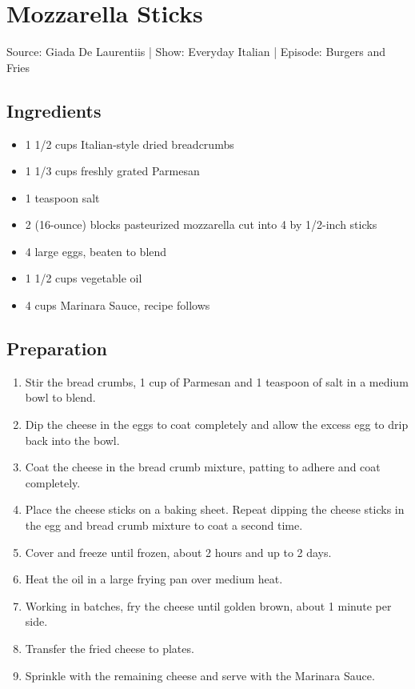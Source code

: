 \section{Mozzarella Sticks}

Source: Giada De Laurentiis |
Show: Everyday Italian |
Episode: Burgers and Fries

\subsection{Ingredients}
\begin{multicols}{2}
\begin{itemize}
    \item 1 1/2 cups Italian-style dried breadcrumbs
    \item 1 1/3 cups freshly grated Parmesan
    \item 1 teaspoon salt
    \item 2 (16-ounce) blocks pasteurized mozzarella cut into 4 by 1/2-inch sticks
    \item 4 large eggs, beaten to blend
    \item 1 1/2 cups vegetable oil
    \item 4 cups Marinara Sauce, recipe follows
\end{itemize}
\end{multicols}

\subsection{Preparation}
\begin{enumerate}
    \item Stir the bread crumbs, 1 cup of Parmesan and 1 teaspoon of salt in a medium bowl to blend. 
    \item Dip the cheese in the eggs to coat completely and allow the excess egg to drip back into the bowl. 
    \item Coat the cheese in the bread crumb mixture, patting to adhere and coat completely. 
    \item Place the cheese sticks on a baking sheet. Repeat dipping the cheese sticks in the egg and bread crumb mixture to coat a second time. 
    \item Cover and freeze until frozen, about 2 hours and up to 2 days.

    \item Heat the oil in a large frying pan over medium heat. 
    \item Working in batches, fry the cheese until golden brown, about 1 minute per side. 
    \item Transfer the fried cheese to plates. 
    \item Sprinkle with the remaining cheese and serve with the Marinara Sauce.
\end{enumerate}

